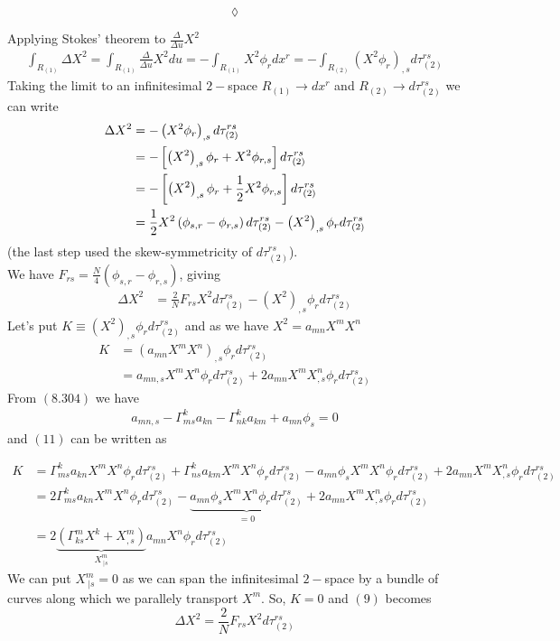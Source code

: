 $$\lozenge$$


Applying Stokes' theorem to $\frac{\Delta}{\Delta u} X^2$
\begin{align}
 \int_{R_{(1)}} \Delta X^2 =\int_{R_{(1)}} \frac{\Delta}{\Delta u} X^2 du=-\int_{R_{(1)}}X^2\phi_r  dx^{r}= - \int_{R_{(2)}} \left( X^2\phi_r\right)_{,s}d\tau_{(2)}^{rs}
\end{align}
Taking the limit to an infinitesimal $2-$space $R_{(1)}\rightarrow dx^{r}$ and $R_{(2)}\rightarrow d\tau_{(2)}^{rs}$ we can write
\begin{align}
\Delta X^2  &= - \left( X^2\phi_r\right)_{,s}d\tau_{(2)}^{rs}\\
&= - \left[\left( X^2\right)_{,s}\phi_r + X^2\phi_{r,s} \right]d\tau_{(2)}^{rs}\\
&= - \left[ \left( X^2\right)_{,s}\phi_r + \frac{1}{2} X^2\phi_{r,s} \right]d\tau_{(2)}^{rs}\\
&= \frac{1}{2} X^2\left(\phi_{s,r}- \phi_{r,s} \right)d\tau_{(2)}^{rs} -  \left( X^2\right)_{,s}\phi_rd\tau_{(2)}^{rs} 
\end{align}
(the last step used the skew-symmetricity of $d\tau_{(2)}^{rs}$).\\

We have $F_{rs} = \frac{N}{4}\left(\phi_{s,r}- \phi_{r,s} \right)$, giving
\begin{align}
\Delta X^2  &= \frac{2}{N}F_{rs}  X^2 d\tau_{(2)}^{rs} -  \left( X^2\right)_{,s}\phi_rd\tau_{(2)}^{rs} 
\end{align}
Let's put $K\equiv \left( X^2\right)_{,s}\phi_rd\tau_{(2)}^{rs} $ and as we have $X^2= a_{mn}X^mX^n$
\begin{align}
K&=\left(a_{mn}X^mX^n\right)_{,s}\phi_r d\tau_{(2)}^{rs}\\
&=a_{mn,s}X^mX^n \phi_r d\tau_{(2)}^{rs}+2a_{mn}X^mX^n_{,s}\phi_r d\tau_{(2)}^{rs}
\end{align}
From $\mathbf{(8.304)}$ we have
\begin{align}
a_{mn,s} -\Gamma^k_{ms}a_{kn}- \Gamma^k_{nk}a_{km}+a_{mn}\phi_s=0
\end{align} 
and $(11)$ can be written as 

\begin{align}
K&= \Gamma^k_{ms}a_{kn}X^mX^n \phi_r d\tau_{(2)}^{rs}+ \Gamma^k_{ns}a_{km}X^mX^n \phi_r d\tau_{(2)}^{rs}-a_{mn}\phi_s X^mX^n \phi_r d\tau_{(2)}^{rs}+2a_{mn}X^mX^n_{,s}\phi_r d\tau_{(2)}^{rs}\\
&= 2\Gamma^k_{ms}a_{kn}X^mX^n \phi_r d\tau_{(2)}^{rs}-\underbrace{a_{mn}\phi_s X^mX^n \phi_r d\tau_{(2)}^{rs}}_{=0}+2a_{mn}X^mX^n_{,s}\phi_r d\tau_{(2)}^{rs}\\
&= 2\underbrace{\left(\Gamma^m_{ks}X^k +X^m_{,s}\right)}_{X^m_{\ |s}}a_{mn}X^n\phi_r d\tau_{(2)}^{rs}
\end{align}
We can put $X^m_{\ |s}=0$ as we can  span the infinitesimal $2-$space by a bundle of curves along which we parallely transport $X^m$.
So, $K=0$ and $(9)$ becomes
$$\Delta X^2  = \frac{2}{N}F_{rs}  X^2 d\tau_{(2)}^{rs}$$

